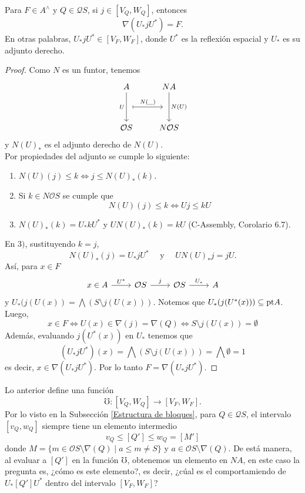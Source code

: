 \begin{prop}
    Para $F\in A^\wedge$ y $Q\in \mathcal{Q}S$, si $j\in [V_Q, W_Q]$, entonces 
    \[
    \nabla(U_* j U^*)=F.
    \]
    En otras palabras, $U_*jU^*\in [V_F,W_F]$, donde $U^*$ es la reflexión espacial y $U_*$ es su adjunto derecho.
\end{prop}

\begin{proof}
    Como $N$ es un funtor, tenemos
   \[\begin{tikzcd}
	A & NA \\
	\\
	{\mathcal{O}S} & {N\mathcal{O}S}
	\arrow[""{name=0, anchor=center, inner sep=0}, "U"', from=1-1, to=3-1]
	\arrow[""{name=1, anchor=center, inner sep=0}, "{N(U)}", from=1-2, to=3-2]
	\arrow["{N(\_)}", shorten <=7pt, shorten >=7pt, maps to, from=0, to=1]
\end{tikzcd}\]
y $N(U)_*$ es el adjunto derecho de $N(U)$.\\

Por propiedades del adjunto se cumple lo siguiente:
\begin{enumerate}
    \item $N(U)(j)\leq k\Leftrightarrow j\leq N(U)_*(k)$.
    \item Si $k\in N\mathcal{O}S$ se cumple que 
    \[
    N(U)(j)\leq k\Leftrightarrow Uj\leq kU
    \]
    \item $N(U)_*(k)=U_*kU^*$ y $UN(U)_*(k)=kU$ (C-Assembly, Corolario 6.7).
\end{enumerate}
En $3)$, sustituyendo $k=j$,  
\[
N(U)_*(j)=U_*jU^* \quad\mbox{ y }\quad UN(U)_*j=jU.
\] 
Así, para $x\in F$
\[\begin{tikzcd}
	x\in A & {\mathcal{O}S} & {\mathcal{O}S} & A
	\arrow["{U^*}", from=1-1, to=1-2]
	\arrow["j", from=1-2, to=1-3]
	\arrow["{U_*}", from=1-3, to=1-4]
\end{tikzcd}\]
y $U_*(j(U(x))=\bigwedge(S\setminus j(U(x)))$. Notemos que $U_*(j(U^*(x)))\subseteq \mathrm{pt} A$. Luego,
\[
x\in F \Leftrightarrow U(x)\in \nabla(j)=\nabla(Q)\Leftrightarrow S\setminus j(U(x))=\emptyset
\]
Además, evaluando $j(U^*(x))$ en $U_*$ tenemos que 
\[
(U_*jU^*)(x)=\bigwedge (S\setminus j(U(x)))=\bigwedge\emptyset=1
\]
es decir, $x\in \nabla(U_*jU^*)$. Por lo tanto $F=\nabla(U_*jU^*)$.
\end{proof}

Lo anterior define una función 
\[
\mho\colon [V_Q, W_Q]\to [V_F, W_F].
\]
Por lo visto en la Subsección \ref{Estructura de bloques}, para $Q\in \mathcal{Q}S$, el intervalo $[v_Q, w_Q]$ siempre tiene un elemento intermedio
\[
v_Q\leq [Q']\leq w_Q=[M']
\]
donde $M=\{m\in \mathcal{O}S\setminus \nabla(Q)\mid a\leq m\neq S\}$ y $a\in \mathcal{O}S\setminus \nabla(Q)$. De está manera, al evaluar a $[Q']$ en la función $\mho$, obtenemos
un elemento en $NA$, en este caso la pregunta es, ¿cómo es este elemento?, es decir, ¿cúal es el comportamiendo de $U_*[Q']U^*$ dentro del intervalo $[V_F, W_F]$?\\

